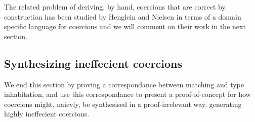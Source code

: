 The related problem of deriving, by hand,
coercions that are correct by construction has been studied by
Henglein and Nielsen in terms of a domain specific language for coercions \cite{HN11} and we will comment on their work in the next section.


\subsection{Synthesizing ineffecient coercions}
We end this section by proving a correspondance between matching and
type inhabitation, and use this correspondance to present a
proof-of-concept for how coercions might, naievly, be synthesised in a
proof-irrelevant way, generating highly ineffecient  coercions.
 
